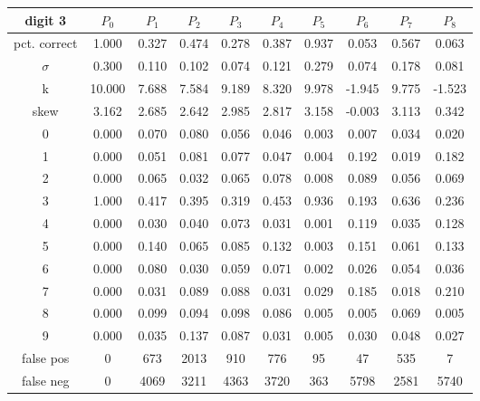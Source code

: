 \documentclass{report}
\begin{document}
\begin{tabular}{ | c ||  c | c | c | c | c | c | c | c | c |}
 digit 3 & $P_0$ & $P_1$ & $P_2$ & $P_3$ & $P_4$ & $P_5$ & $P_6$ & $P_7$ & $P_8$ \\
\hline \hline
pct. correct  & 1.000 & 0.327 & 0.474 & 0.278 & 0.387 & 0.937 & 0.053 & 0.567 & 0.063 \\
\hline
$\sigma$ & 0.300& 0.110& 0.102& 0.074& 0.121& 0.279& 0.074& 0.178& 0.081 \\
\hline
k & 10.000& 7.688& 7.584& 9.189& 8.320& 9.978& -1.945& 9.775& -1.523 \\
\hline
skew & 3.162& 2.685& 2.642& 2.985& 2.817& 3.158& -0.003& 3.113& 0.342 \\
\hline
0 & 0.000 & 0.070 & 0.080 & 0.056 & 0.046 & 0.003 & 0.007 & 0.034 & 0.020 \\
\hline
1 & 0.000 & 0.051 & 0.081 & 0.077 & 0.047 & 0.004 & 0.192 & 0.019 & 0.182 \\
\hline
2 & 0.000 & 0.065 & 0.032 & 0.065 & 0.078 & 0.008 & 0.089 & 0.056 & 0.069 \\
\hline
3 & 1.000 & 0.417 & 0.395 & 0.319 & 0.453 & 0.936 & 0.193 & 0.636 & 0.236 \\
\hline
4 & 0.000 & 0.030 & 0.040 & 0.073 & 0.031 & 0.001 & 0.119 & 0.035 & 0.128 \\
\hline
5 & 0.000 & 0.140 & 0.065 & 0.085 & 0.132 & 0.003 & 0.151 & 0.061 & 0.133 \\
\hline
6 & 0.000 & 0.080 & 0.030 & 0.059 & 0.071 & 0.002 & 0.026 & 0.054 & 0.036 \\
\hline
7 & 0.000 & 0.031 & 0.089 & 0.088 & 0.031 & 0.029 & 0.185 & 0.018 & 0.210 \\
\hline
8 & 0.000 & 0.099 & 0.094 & 0.098 & 0.086 & 0.005 & 0.005 & 0.069 & 0.005 \\
\hline
9 & 0.000 & 0.035 & 0.137 & 0.087 & 0.031 & 0.005 & 0.030 & 0.048 & 0.027 \\
\hline
false pos  & 0 & 673 & 2013 & 910 & 776 & 95 & 47 & 535 & 7 \\
\hline
false neg  & 0 & 4069 & 3211 & 4363 & 3720 & 363 & 5798 & 2581 & 5740 \\
\hline
\end{tabular}

\vspace{1cm}
\end{document}
